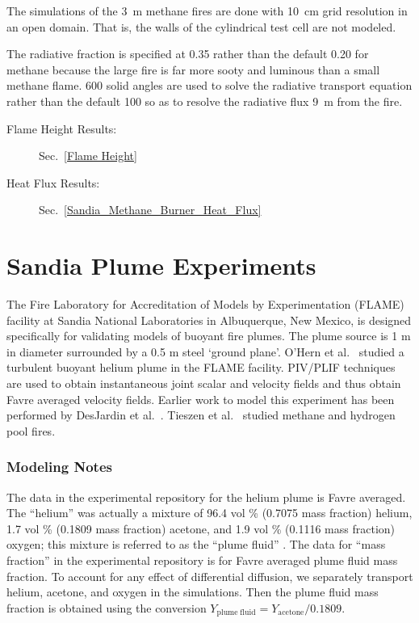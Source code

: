 The simulations of the 3~m methane fires are done with 10~cm grid resolution in an open domain. That is, the walls of the cylindrical test cell are not modeled.

The radiative fraction is specified at 0.35 rather than the default 0.20 for methane because the large fire is far more sooty and luminous than a small methane flame. 600 solid angles are used to solve the radiative transport equation rather than the default 100 so as to resolve the radiative flux 9~m from the fire.

\begin{description}
\item[Flame Height Results:] Sec.~\ref{Flame Height}
\item[Heat Flux Results:] Sec.~\ref{Sandia_Methane_Burner_Heat_Flux}
\end{description}

\FloatBarrier

\section{Sandia Plume Experiments}
\label{Sandia_Plume_Description}

The Fire Laboratory for Accreditation of Models by Experimentation (FLAME) facility \cite{OHern:2005,Blanchat:2001} at Sandia National Laboratories in Albuquerque, New Mexico, is designed specifically for validating models of buoyant fire plumes.  The plume source is 1 m in diameter surrounded by a 0.5 m steel `ground plane'.  O'Hern et al.~\cite{OHern:2005} studied a turbulent buoyant helium plume in the FLAME facility. PIV/PLIF techniques are used to obtain instantaneous joint scalar and velocity fields and thus obtain Favre averaged velocity fields. Earlier work to model this experiment has been performed by DesJardin et al.~\cite{DesJardin:2004}. Tieszen et al.~\cite{Tieszen:2004,Tieszen:2002} studied methane and hydrogen pool fires.

\subsubsection{Modeling Notes}

The data in the experimental repository for the helium plume is Favre averaged.  The ``helium'' was actually a mixture of 96.4 vol \% (0.7075 mass fraction) helium, 1.7 vol \% (0.1809 mass fraction) acetone, and 1.9 vol \% (0.1116 mass fraction) oxygen; this mixture is referred to as the ``plume fluid'' \cite{OHern:2005}.  The data for ``mass fraction'' in the experimental repository is for Favre averaged plume fluid mass fraction.  To account for any effect of differential diffusion, we separately transport helium, acetone, and oxygen in the simulations.  Then the plume fluid mass fraction is obtained using the conversion $Y_{\mathrm{plume\;fluid}} = Y_{\mathrm{acetone}}/0.1809$.

